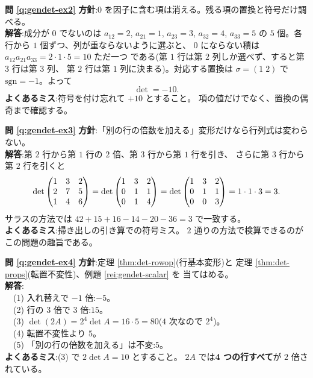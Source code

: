 \bigskip
\noindent\textbf{問 \ref{q:gendet-ex2}}\quad
\textbf{方針}:$0$ を因子に含む項は消える。残る項の置換と符号だけ調べる。\\
\textbf{解答}:成分が $0$ でないのは
$a_{12} = 2$, $a_{21} = 1$, $a_{23} = 3$, $a_{32} = 4$, $a_{33} = 5$ の
$5$ 個。各行から $1$ 個ずつ、列が重ならないように選ぶと、
$0$ にならない積は $a_{12}a_{21}a_{33} = 2 \cdot 1 \cdot 5 = 10$ ただ一つ
である(第 $1$ 行は第 $2$ 列しか選べず、すると第 $3$ 行は第 $3$ 列、
第 $2$ 行は第 $1$ 列に決まる)。対応する置換は
$\sigma = (1\;2)$ で $\mathrm{sgn} = -1$。よって
\[
\det = -10.
\]
\textbf{よくあるミス}:符号を付け忘れて $+10$ とすること。
項の値だけでなく、置換の偶奇まで確認する。

\bigskip
\noindent\textbf{問 \ref{q:gendet-ex3}}\quad
\textbf{方針}:「別の行の倍数を加える」変形だけなら行列式は変わらない。\\
\textbf{解答}:第 $2$ 行から第 $1$ 行の $2$ 倍、第 $3$ 行から第 $1$ 行を引き、
さらに第 $3$ 行から第 $2$ 行を引くと
\[
\det \begin{pmatrix}1 & 3 & 2 \\ 2 & 7 & 5 \\ 1 & 4 & 6\end{pmatrix}
= \det \begin{pmatrix}1 & 3 & 2 \\ 0 & 1 & 1 \\ 0 & 1 & 4\end{pmatrix}
= \det \begin{pmatrix}1 & 3 & 2 \\ 0 & 1 & 1 \\ 0 & 0 & 3\end{pmatrix}
= 1 \cdot 1 \cdot 3 = 3.
\]
サラスの方法では
$42 + 15 + 16 - 14 - 20 - 36 = 3$ で一致する。\\
\textbf{よくあるミス}:掃き出しの引き算での符号ミス。
$2$ 通りの方法で検算できるのがこの問題の趣旨である。

\bigskip
\noindent\textbf{問 \ref{q:gendet-ex4}}\quad
\textbf{方針}:定理 \ref{thm:det-rowop}(行基本変形)と
定理 \ref{thm:det-props}(転置不変性)、例題 \ref{rei:gendet-scalar} を
当てはめる。\\
\textbf{解答}:\\
　(1) 入れ替えで $-1$ 倍:$-5$。\\
　(2) 行の $3$ 倍で $3$ 倍:$15$。\\
　(3) $\det(2A) = 2^4 \det A = 16 \cdot 5 = 80$($4$ 次なので $2^4$)。\\
　(4) 転置不変性より $5$。\\
　(5) 「別の行の倍数を加える」は不変:$5$。\\
\textbf{よくあるミス}:(3) で $2 \det A = 10$ とすること。
$2A$ では\textbf{4 つの行すべて}が $2$ 倍されている。

